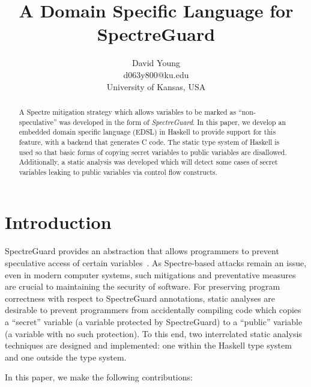 \documentclass[10pt, conference]{IEEEtran}
\begin{document}
\title{A Domain Specific Language for SpectreGuard}
\author{David Young\\
d063y800@ku.edu\\
University of Kansas, USA\\
}

\maketitle
\thispagestyle{empty}
\begin{abstract}

  A Spectre mitigation strategy which allows variables to be marked
  as ``non-speculative'' was developed in the form of \textit{SpectreGuard}\cite{SpectreGuard}. In this paper, we
  develop an embedded domain specific language (EDSL) in Haskell to provide
  support for this feature, with a backend that generates C code. The static
  type system of Haskell is used so that basic forms of copying secret
  variables to public variables are disallowed. Additionally, a static analysis
  was developed which will detect some cases of secret variables leaking to
  public variables via control flow constructs.

\end{abstract}


\section{Introduction}
\label{sec:Introduction}
SpectreGuard provides an abstraction that allows programmers to prevent
speculative access of certain variables~\cite{SpectreGuard}. As Spectre-based
attacks remain an issue, even in modern computer systems, such mitigations and
preventative measures are crucial to maintaining the security of software.  For
preserving program correctness with respect to SpectreGuard annotations, static analyses are desirable to prevent
programmers from accidentally compiling code which copies a
``secret'' variable (a variable protected by SpectreGuard) to a ``public''
variable (a variable with no such protection). To this end, two interrelated
static analysis techniques are designed and implemented: one within the Haskell type system and
one outside the type system.

In this paper, we make the following contributions:
\end{document}

